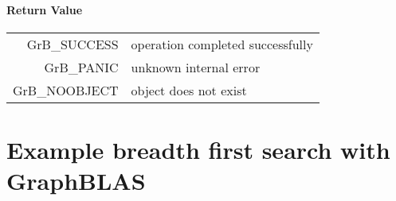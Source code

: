 \documentclass[11pt]{extarticle}
\begin{document}
\paragraph{Return Value}

\begin{tabular}{rl}
{\sf GrB\_SUCCESS}	& operation completed successfully \\
{\sf GrB\_PANIC}	& unknown internal error \\
{\sf GrB\_NOOBJECT}	& object does not exist \\
\end{tabular}



\appendix

\pagebreak

\section{Example breadth first search with GraphBLAS}
{\scriptsize

}
\end{document}

